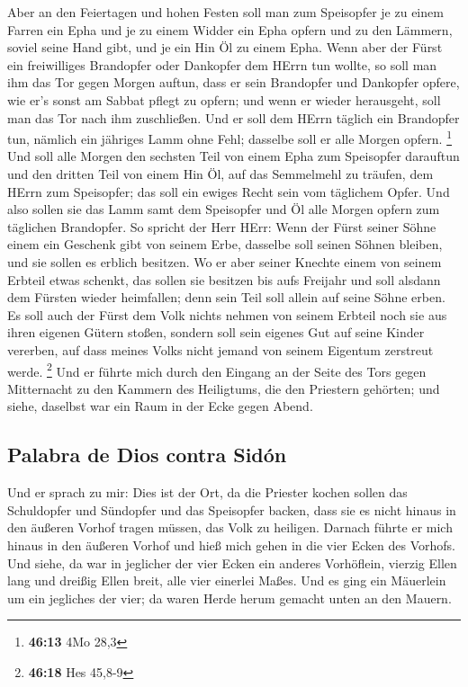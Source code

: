  Aber an den Feiertagen und hohen Festen soll man zum
Speisopfer je zu einem Farren ein Epha und je zu einem Widder ein Epha
opfern und zu den Lämmern, soviel seine Hand gibt, und je ein Hin Öl zu
einem Epha.  Wenn aber der Fürst ein freiwilliges
Brandopfer oder Dankopfer dem HErrn tun wollte, so soll man ihm das Tor
gegen Morgen auftun, dass er sein Brandopfer und Dankopfer opfere, wie
er's sonst am Sabbat pflegt zu opfern; und wenn er wieder herausgeht,
soll man das Tor nach ihm zuschließen.  Und er soll dem
HErrn täglich ein Brandopfer tun, nämlich ein jähriges Lamm ohne Fehl;
dasselbe soll er alle Morgen opfern. \footnote{\textbf{46:13} 4Mo 28,3}
 Und soll alle Morgen den sechsten Teil von einem Epha
zum Speisopfer darauftun und den dritten Teil von einem Hin Öl, auf das
Semmelmehl zu träufen, dem HErrn zum Speisopfer; das soll ein ewiges
Recht sein vom täglichem Opfer.  Und also sollen sie das
Lamm samt dem Speisopfer und Öl alle Morgen opfern zum täglichen
Brandopfer.  So spricht der Herr HErr: Wenn der Fürst
seiner Söhne einem ein Geschenk gibt von seinem Erbe, dasselbe soll
seinen Söhnen bleiben, und sie sollen es erblich besitzen.
 Wo er aber seiner Knechte einem von seinem Erbteil etwas
schenkt, das sollen sie besitzen bis aufs Freijahr und soll alsdann dem
Fürsten wieder heimfallen; denn sein Teil soll allein auf seine Söhne
erben.  Es soll auch der Fürst dem Volk nichts nehmen von
seinem Erbteil noch sie aus ihren eigenen Gütern stoßen, sondern soll
sein eigenes Gut auf seine Kinder vererben, auf dass meines Volks nicht
jemand von seinem Eigentum zerstreut werde. \footnote{\textbf{46:18} Hes
  45,8-9}  Und er führte mich durch den Eingang an der
Seite des Tors gegen Mitternacht zu den Kammern des Heiligtums, die den
Priestern gehörten; und siehe, daselbst war ein Raum in der Ecke gegen
Abend.

\hypertarget{palabra-de-dios-contra-siduxf3n}{%
\subsection{Palabra de Dios contra
Sidón}\label{palabra-de-dios-contra-siduxf3n}}

 Und er sprach zu mir: Dies ist der Ort, da die Priester
kochen sollen das Schuldopfer und Sündopfer und das Speisopfer backen,
dass sie es nicht hinaus in den äußeren Vorhof tragen müssen, das Volk
zu heiligen.  Darnach führte er mich hinaus in den
äußeren Vorhof und hieß mich gehen in die vier Ecken des Vorhofs.
 Und siehe, da war in jeglicher der vier Ecken ein
anderes Vorhöflein, vierzig Ellen lang und dreißig Ellen breit, alle
vier einerlei Maßes.  Und es ging ein Mäuerlein um ein
jegliches der vier; da waren Herde herum gemacht unten an den Mauern.

